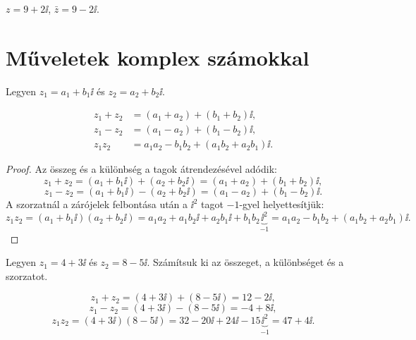 \documentclass[11pt]{article}
\begin{document}
\begin{exbox}
\begin{example}
$z=9+2\ii$, $\bar z=9-2\ii$.
\end{example}
\end{exbox}

\section{Műveletek komplex számokkal}

Legyen $z_{1}=a_{1}+b_{1}\ii$ és $z_{2}=a_{2}+b_{2}\ii$.

\begin{thmbox}
\begin{proposition}
\begin{align}
z_{1}+z_{2}&=(a_{1}+a_{2})+(b_{1}+b_{2})\ii, \label{eq:osszeg}\\
z_{1}-z_{2}&=(a_{1}-a_{2})+(b_{1}-b_{2})\ii, \label{eq:kulonbseg}\\
z_{1}z_{2}&=a_{1}a_{2}-b_{1}b_{2}+(a_{1}b_{2}+a_{2}b_{1})\ii. \label{eq:szorzat}
\end{align}
\end{proposition}
\end{thmbox}
\begin{proof}
Az összeg és a különbség a tagok átrendezésével adódik:
\[
z_{1}+z_{2}=(a_{1}+b_{1}\ii)+(a_{2}+b_{2}\ii)=(a_{1}+a_{2})+(b_{1}+b_{2})\ii,
\]
\[
z_{1}-z_{2}=(a_{1}+b_{1}\ii)-(a_{2}+b_{2}\ii)=(a_{1}-a_{2})+(b_{1}-b_{2})\ii .
\]
A szorzatnál a zárójelek felbontása után a $\ii^{2}$ tagot $-1$-gyel helyettesítjük:
\[
z_{1}z_{2}=(a_{1}+b_{1}\ii)(a_{2}+b_{2}\ii)
=a_{1}a_{2}+a_{1}b_{2}\ii+a_{2}b_{1}\ii+b_{1}b_{2}\underbrace{\ii^{2}}_{-1}
=a_{1}a_{2}-b_{1}b_{2}+(a_{1}b_{2}+a_{2}b_{1})\ii .
\]
\end{proof}

\begin{exbox}
\begin{example}
Legyen $z_{1}=4+3\ii$ és $z_{2}=8-5\ii$. Számítsuk ki az összeget, a különbséget és a szorzatot.
\end{example}
\end{exbox}
\begin{solution}
\[
z_{1}+z_{2}=(4+3\ii)+(8-5\ii)=12-2\ii,
\]
\[
z_{1}-z_{2}=(4+3\ii)-(8-5\ii)=-4+8\ii,
\]
\[
z_{1}z_{2}=(4+3\ii)(8-5\ii)=32-20\ii+24\ii-15\underbrace{\ii^{2}}_{-1}=47+4\ii .
\]
\end{solution}
\end{document}
